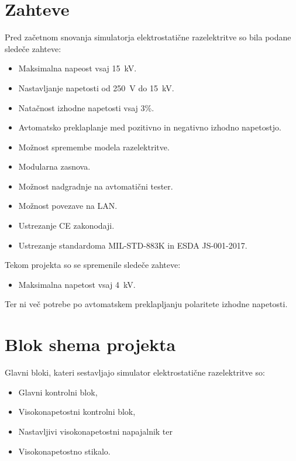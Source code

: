 \documentclass[a4paper,twoside,openright,12pt,slovene]{book}
\begin{document}
\chapter{Zahteve} \label{Zahteve}

Pred začetnom snovanja simulatorja elektrostatične razelektritve so bila podane sledeče zahteve:
\begin{itemize}
\item Maksimalna napeost vsaj \SI{15}{\kilo\volt}.
\item Nastavljanje napetosti od \SI{250}{\volt} do \SI{15}{\kilo\volt}.
\item Natačnost izhodne napetosti vsaj 3\%.
\item Avtomatsko preklaplanje med pozitivno in negativno izhodno napetostjo.
\item Možnost spremembe modela razelektritve.
\item Modularna zasnova.
\item Možnost nadgradnje na avtomatični tester.
\item Možnost povezave na LAN.
\item Ustrezanje CE zakonodaji.
\item Ustrezanje standardoma MIL-STD-883K in ESDA JS-001-2017.
\end{itemize}

Tekom projekta so se spremenile sledeče zahteve:
\begin{itemize}
\item Maksimalna napetost vsaj \SI{4}{\kilo\volt}.
\end{itemize}
Ter ni več potrebe po avtomatskem preklapljanju polaritete izhodne napetosti.

\chapter{Blok shema projekta} \label{blokshemaprojekta}

Glavni bloki, kateri sestavljajo simulator elektrostatične razelektritve so:
\begin{itemize}
\item Glavni kontrolni blok,
\item Visokonapetostni kontrolni blok,
\item Nastavljivi visokonapetostni napajalnik ter
\item Visokonapetostno stikalo.
\end{itemize}
\end{document}
